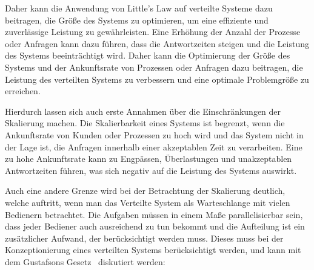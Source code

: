 \documentclass[../vs-script-first-v01.tex]{subfiles}
\begin{document}
\begin{itemize}
        Daher kann die Anwendung von Little's Law auf verteilte Systeme dazu beitragen, die Größe des Systems zu optimieren, um eine effiziente und zuverlässige Leistung zu gewährleisten. Eine Erhöhung der Anzahl der Prozesse oder Anfragen kann dazu führen, dass die Antwortzeiten steigen und die Leistung des Systems beeinträchtigt wird. Daher kann die Optimierung der Größe des Systems und der Ankunftsrate von Prozessen oder Anfragen dazu beitragen, die Leistung des verteilten Systems zu verbessern und eine optimale Problemgröße zu erreichen.

        Hierdurch lassen sich auch erste Annahmen über die Einschränkungen der Skalierung machen. Die Skalierbarkeit eines Systems ist begrenzt, wenn die Ankunftsrate von Kunden oder Prozessen zu hoch wird und das System nicht in der Lage ist, die Anfragen innerhalb einer akzeptablen Zeit zu verarbeiten. Eine zu hohe Ankunftsrate kann zu Engpässen, Überlastungen und unakzeptablen Antwortzeiten führen, was sich negativ auf die Leistung des Systems auswirkt.

        Auch eine andere Grenze wird bei der Betrachtung der Skalierung deutlich, welche auftritt, wenn man das Verteilte System als Warteschlange mit vielen Bedienern betrachtet. Die Aufgaben müssen in einem Maße parallelisierbar sein, dass jeder Bediener auch ausreichend zu tun bekommt und die Aufteilung ist ein zusätzlicher Aufwand, der berücksichtigt werden muss. Dieses muss bei der Konzeptionierung eines verteilten Systems berücksichtigt werden, und kann mit dem Gustafsons Gesetz~\cite{gustafson1988reevaluating} diskutiert werden:
\end{itemize}
\end{document}
